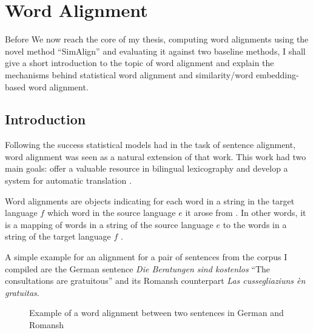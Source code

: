 \chapter{Word Alignment}\label{chap:word-alignment}

Before We now reach the core of my thesis, computing word alignments using the novel method \enquote{SimAlign} \autocite{jalili-sabet-etal-2020-simalign} and evaluating it against two baseline methods, I shall give a short introduction to the topic of word alignment and explain the mechanisms behind statistical word alignment and  similarity/word embedding-based word alignment.

\section{Introduction}
Following the success statistical models had in the task of sentence alignment, word alignment was seen as a natural extension of that work. 
This work had two main goals: offer a valuable resource in bilingual lexicography and develop a system for automatic translation \autocite{brown-etal-1993-mathematics}. 

Word alignments are objects indicating for each word in a string in the target language \(f\) which word in the source language \(e\) it arose from \autocite{brown-etal-1993-mathematics}. 
In other words, it is a mapping of words in a string of the source language \(e\) to the words in a string of the target language \(f\) \autocite[84]{koehn2009}.

A simple example for an alignment for a pair of sentences from the corpus I compiled are the German sentence \emph{Die Beratungen sind kostenlos} \enquote{The consultations are gratuitous} and its Romansh counterpart \emph{Las cussegliaziuns èn gratuitas}. 


\begin{figure}[h]
\centering

    

\vspace*{1cm}

   
\caption[Word alignment example]{Example of a word alignment between two sentences in German and Romansh}
\end{figure}



